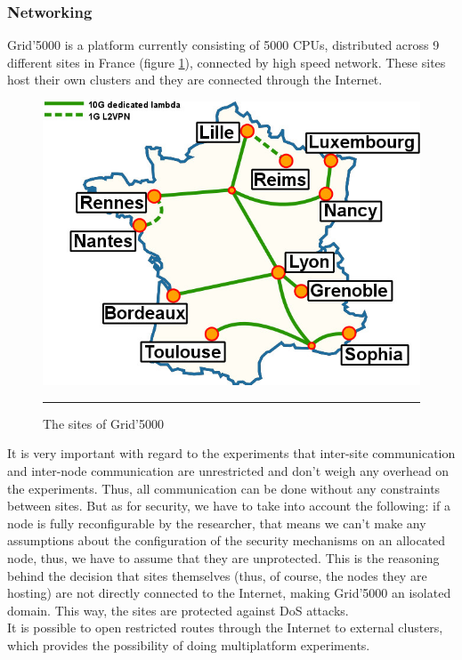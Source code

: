 \subsubsection{Networking}
Grid'5000 is a platform currently consisting of 5000 CPUs, distributed
across 9 different sites in France (figure \ref{fig:g5ksites}),
connected by high speed network. These sites host their own clusters
and they are connected through the Internet.
\begin{figure}[htbp]
  \centering
    \includegraphics[scale=2]{./Figures/Renater5-g5k.jpg}
    \rule{35em}{0.5pt}
  \caption[Grid'5000 sites]{The sites of Grid'5000}
  \label{fig:g5ksites}
\end{figure}
It is very important with regard to the
experiments that inter-site communication and inter-node communication
are unrestricted and don't weigh any overhead on the
experiments. Thus, all communication can be done without any
constraints between sites. But
as for security, we have to take into account the following: if a
node is fully reconfigurable by the researcher, that means we
can't make any assumptions about the configuration of the security
mechanisms on an allocated node, thus, we have to assume that they are
unprotected. This is the reasoning behind the decision that sites
themselves (thus, of course, the nodes they are hosting) are not
directly connected to the Internet, making Grid'5000 an isolated
domain. This way, the sites are protected against DoS attacks.\\
It is possible to open restricted routes through the Internet to
external clusters, which provides the possibility of doing
multiplatform experiments.

